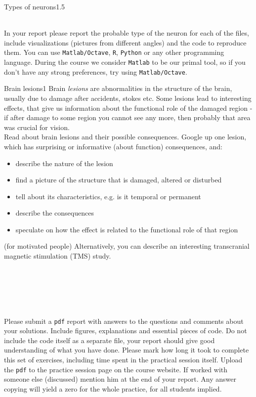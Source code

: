 \documentclass[a4paper,11pt]{article}
\begin{document}
\begin{exercise}{3}{Types of neurons}{1.5}
\begin{enumerate}
\end{enumerate}
\ \\
In your report please report the probable type of the neuron for each of the files, include visualizations (pictures from different angles) and the code to reproduce them. You can use \texttt{Matlab/Octave}, \texttt{R}, \texttt{Python} or any other programming language. During the course we consider \texttt{Matlab} to be our primal tool, so if you don't have any strong preferences, try using \texttt{Matlab/Octave}.
\end{exercise}

%
%
\begin{exercise}{4}{Brain lesions}{1}
Brain \emph{lesions} are abnormalities in the structure of the brain, usually due to damage after accidents, stokes etc. Some lesions lead to interesting effects, that give us information about the functional role of the damaged region - if after damage to some region you cannot see any more, then probably that area was crucial for vision. \\
Read about brain lesions and their possible consequences. Google up one lesion, which has surprising or informative (about function) consequences, and:
\begin{itemize}
\itemsep 0em
	\item describe the nature of the lesion
	\item find a picture of the structure that is damaged, altered or disturbed
	\item tell about its characteristics, e.g. is it temporal or permanent
	\item describe the consequences
	\item speculate on how the effect is related to the functional role of that region
\end{itemize}
(for motivated people) Alternatively, you can describe an interesting transcranial magnetic stimulation (TMS) study.
\end{exercise}


\ \\
\ \\
\ \\
\ \\
\ \\
Please submit a \texttt{pdf} report with answers to the questions and comments about your solutions. Include figures, explanations and essential pieces of code. Do not include the code itself as a separate file, your report should give good understanding of what you have done. Please mark how long it took to complete this set of exercises, including time spent in the practical session itself. Upload the \texttt{pdf} to the practice session page on the course website. If worked with someone else (discussed) mention him at the end of your report. Any answer copying will yield a zero for the whole practice, for all students implied.
\end{document}
